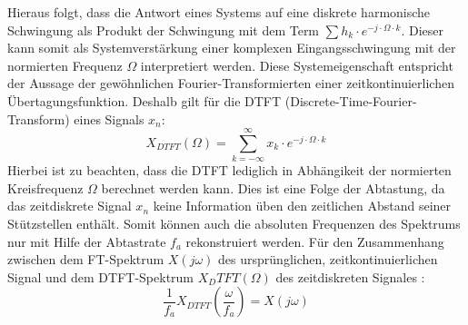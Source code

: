 Hieraus folgt, dass die Antwort eines Systems auf eine diskrete harmonische Schwingung als Produkt der Schwingung mit dem Term $\sum h_k \cdot e^{-j\cdot \Omega \cdot k}$. Dieser kann somit als Systemverstärkung einer komplexen Eingangsschwingung mit der normierten Frequenz $\Omega$ interpretiert werden. Diese Systemeigenschaft entspricht der Aussage der gewöhnlichen Fourier-Transformierten einer zeitkontinuierlichen Übertagungsfunktion. Deshalb gilt für die DTFT (Discrete-Time-Fourier-Transform) eines Signals $x_n$:
\begin{equation}
X_{DTFT}(\Omega) = \sum^{\infty}_{k=-\infty} x_k \cdot e^{-j\cdot \Omega \cdot k}
\end{equation}
Hierbei ist zu beachten, dass die DTFT lediglich in Abhängikeit der normierten Kreisfrequenz $\Omega$ berechnet werden kann. Dies ist eine Folge der Abtastung, da das zeitdiskrete Signal $x_n$ keine Information üben den zeitlichen Abstand seiner Stützstellen enthält. Somit können auch die absoluten Frequenzen des Spektrums nur mit Hilfe der Abtastrate $f_a$ rekonstruiert werden. Für den Zusammenhang zwischen dem FT-Spektrum $X(j\omega)$ des ursprünglichen, zeitkontinuierlichen Signal  und dem DTFT-Spektrum $X_DTFT(\Omega)$ des zeitdiskreten Signales :
\begin{equation}
\frac{1}{f_a}X_{DTFT}(\frac{\omega}{f_a}) = X(j\omega)
\end{equation}

